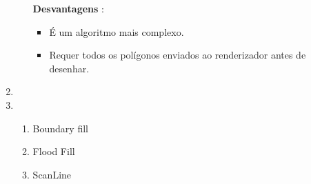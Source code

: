 \begin{enumerate}[label=\arabic*)]
\begin{enumerate}[label=\alph*.]
		\textbf{Desvantagens} : 
		
				\begin{itemize}
					\item É um algoritmo mais complexo.
					\item Requer todos os polígonos enviados ao renderizador antes de desenhar.
				\end{itemize}

 	\end{enumerate}
 	
 	\item  
 	
 	\item 
 	
 	        \begin{enumerate}[label=\alph*.]
					\setlength\itemsep{1em}
		
					\item Boundary fill 
		
					\item Flood Fill 
		
					\item ScanLine 
									
 			  \end{enumerate}
 			 
   \end{enumerate}
